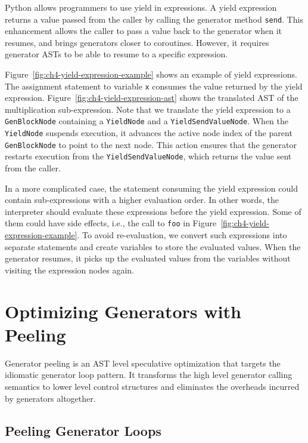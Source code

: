 Python allows programmers to use yield in expressions.
A yield expression returns a value passed from the caller by calling the generator method \texttt{send}.
This enhancement allows the caller to pass a value back to the generator when it resumes, and brings generators closer to coroutines.
However, it requires generator ASTs to be able to resume to a specific expression.

Figure~\ref{fig:ch4-yield-expression-example} shows an example of yield expressions.
The assignment statement to variable \texttt{x} consumes the value returned by the yield expression.
Figure~\ref{fig:ch4-yield-expression-ast} shows the translated AST of the multiplication sub-expression.
Note that we translate the yield expression to a \texttt{GenBlockNode} containing a \texttt{YieldNode} and a \texttt{YieldSendValueNode}.
When the \texttt{YieldNode} suspends execution, it advances the active node index of the parent \texttt{GenBlockNode} to point to the next node.
This action ensures that the generator restarts execution from the \texttt{YieldSendValueNode}, which returns the value sent from the caller.

In a more complicated case, the statement consuming the yield expression could contain sub-expressions with a higher evaluation order.
In other words, the interpreter should evaluate these expressions before the yield expression.
Some of them could have side effects, i.e., the call to \texttt{foo} in Figure~\ref{fig:ch4-yield-expression-example}.
To avoid re-evaluation, we convert such expressions into separate statements and create variables to store the evaluated values.
When the generator resumes, it picks up the evaluated values from the variables without visiting the expression nodes again.

\section{Optimizing Generators with Peeling}
\label{sec:ch4-generaor-peeling}

Generator peeling is an AST level speculative optimization that targets the idiomatic generator loop pattern.
It transforms the high level generator calling semantics to lower level control structures and eliminates the overheads incurred by generators altogether.

\subsection{Peeling Generator Loops}

